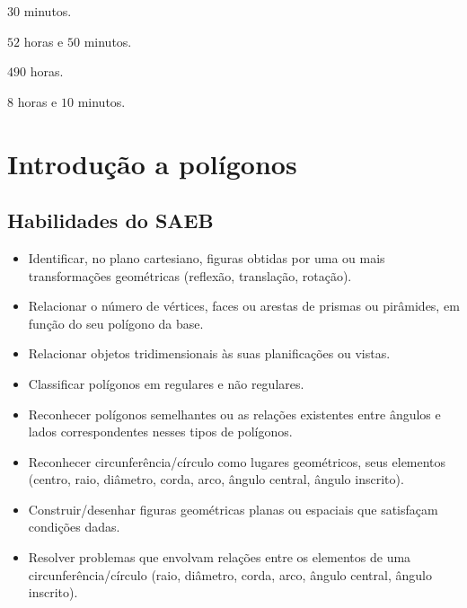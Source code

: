 \begin{escolha}
\item $30$ minutos.
\item $52$ horas e $50$ minutos.
\item $490$ horas.
\item $8$ horas e $10$ minutos.
\end{escolha}




\chapter{Introdução a polígonos}

\section*{Habilidades do SAEB} 
\begin{itemize}
\item Identificar, no plano cartesiano, figuras obtidas
por uma ou mais transformações geométricas (reflexão, translação,
rotação).
\item
  Relacionar o número de vértices, faces ou arestas de prismas ou
  pirâmides, em função do seu polígono da base.
\item
  Relacionar objetos tridimensionais às suas planificações ou vistas.
\item
  Classificar polígonos em regulares e não regulares.
\item
  Reconhecer polígonos semelhantes ou as relações existentes entre
  ângulos e lados correspondentes nesses tipos de polígonos.
\item
  Reconhecer circunferência/círculo como lugares geométricos, seus
  elementos (centro, raio, diâmetro, corda, arco, ângulo central, ângulo
  inscrito).
\item
  Construir/desenhar figuras geométricas planas ou espaciais que
  satisfaçam condições dadas.
\item
  Resolver problemas que envolvam relações entre os elementos de uma
  circunferência/círculo (raio, diâmetro, corda, arco, ângulo central,
  ângulo inscrito).
\end{itemize}

